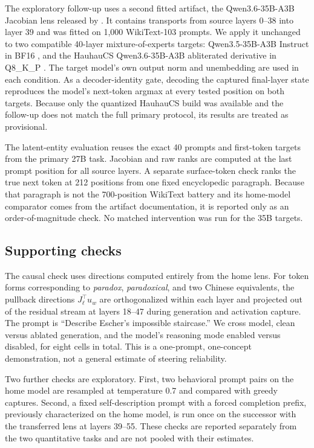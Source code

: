 \documentclass[10pt,a4paper,twocolumn]{article}
\begin{document}
The exploratory follow-up uses a second fitted artifact, the
Qwen3.6-35B-A3B Jacobian lens released by \citet{stanley2026lens35}. It
contains transports from source layers 0--38 into layer 39 and was fitted on
1{,}000 WikiText-103 prompts. We apply it unchanged to two compatible
40-layer mixture-of-experts targets: Qwen3.5-35B-A3B Instruct in BF16
\citep{qwen35card}, and the HauhauCS Qwen3.6-35B-A3B abliterated derivative
in Q8\_K\_P \citep{hauhau2026model}. The target model's own output norm and
unembedding are used in each condition. As a decoder-identity gate, decoding
the captured final-layer state reproduces the model's next-token argmax at
every tested position on both targets. Because only the quantized HauhauCS
build was available and the follow-up does not match the full primary
protocol, its results are treated as provisional.

The latent-entity evaluation reuses the exact 40 prompts and first-token
targets from the primary 27B task. Jacobian and raw ranks are computed at the
last prompt position for all source layers. A separate surface-token check
ranks the true next token at 212 positions from one fixed encyclopedic
paragraph. Because that paragraph is not the 700-position WikiText battery
and its home-model comparator comes from the artifact documentation, it is
reported only as an order-of-magnitude check. No matched intervention was run
for the 35B targets.

\subsection{Supporting checks}
\label{sec:supporting-methods}

The causal check uses directions computed entirely from the home lens. For
token forms corresponding to \emph{paradox}, \emph{paradoxical}, and two
Chinese equivalents, the pullback directions $J_\ell^{\top}u_w$ are
orthogonalized within each layer and projected out of the residual stream at
layers 18--47 during generation and activation capture. The prompt is
``Describe Escher's impossible staircase.'' We cross model, clean versus
ablated generation, and the model's reasoning mode enabled versus disabled,
for eight cells in total. This is a one-prompt, one-concept demonstration, not
a general estimate of steering reliability.

Two further checks are exploratory. First, two behavioral prompt pairs on the
home model are resampled at temperature 0.7 and compared with greedy captures.
Second, a fixed self-description prompt with a forced completion prefix,
previously characterized on the home model, is run once on the successor with
the transferred lens at layers 39--55. These checks are reported separately
from the two quantitative tasks and are not pooled with their estimates.
\end{document}
